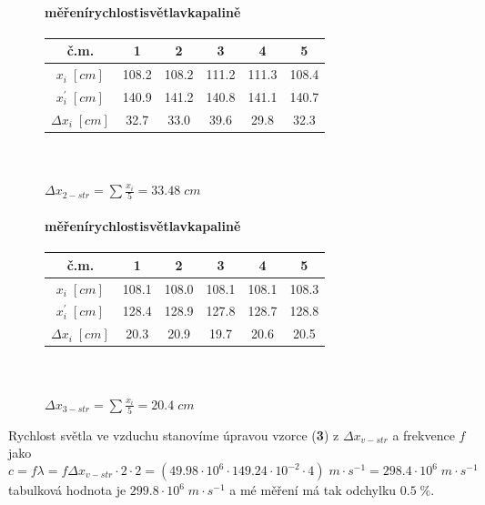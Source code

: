 \documentclass{article}
\begin{document}
\begin{figure}[H]
	\begin{minipage}[t]{0.35\textwidth}
        \paragraph*{měření\;rychlosti\;světla\;v\;kapalině}
        \begin{tabular}{|c|c|c|c|c|c|}
            \hline
            č.\;m.                      & 1     & 2     & 3     & 4     & 5     \\ \hline
            \(x_i\;[cm]\)               & 108.2 & 108.2 & 111.2 & 111.3 & 108.4 \\ \hline
            \(x_{i}^{\prime}\;[cm]\)    & 140.9 & 141.2 & 140.8 & 141.1 & 140.7 \\ \hline
            \(\Delta x_{i}\;[cm]\)      & 32.7  & 33.0  & 39.6  & 29.8  & 32.3  \\ \hline
        \end{tabular}
        \\ \\
        \(\Delta x_{2-str}=\sum \frac{x_{i}}{5}=33.48\;cm\)
    \end{minipage}
    \hfill
	\begin{minipage}[t]{0.5\textwidth}
        \paragraph*{měření\;rychlosti\;světla\;v\;kapalině}
        \begin{tabular}{|c|c|c|c|c|c|}
            \hline
            č.\;m.                      & 1     & 2     & 3     & 4     & 5     \\ \hline
            \(x_i\;[cm]\)               & 108.1 & 108.0 & 108.1 & 108.1 & 108.3 \\ \hline
            \(x_{i}^{\prime}\;[cm]\)    & 128.4 & 128.9 & 127.8 & 128.7 & 128.8 \\ \hline
            \(\Delta x_{i}\;[cm]\)      & 20.3  & 20.9  & 19.7  & 20.6  & 20.5  \\ \hline
        \end{tabular}
        \\ \\
        \(\Delta x_{3-str}=\sum \frac{x_{i}}{5}=20.4\;cm\)
    \end{minipage}
\end{figure}

Rychlost světla ve vzduchu stanovíme úpravou vzorce (\textbf{3})  z \(\Delta x_{v-str}\) a frekvence \(f\) jako
\\
\begin{displaymath}
    c=f \lambda=f \Delta x_{v-str}\cdot2\cdot2=(49.98\cdot10^{6}\cdot149.24\cdot10^{-2}\cdot4)\;m\cdot s^{-1}=298.4\cdot10^{6}\;m\cdot s^{-1}
\end{displaymath} 
tabulková hodnota je \(299.8\cdot10^{6}\;m\cdot s^{-1}\) a mé měření má tak odchylku \(0.5\;\%\).
\end{document}
